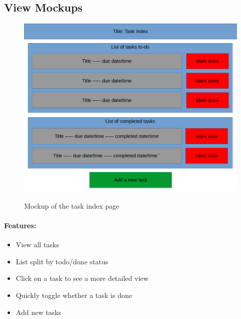 \documentclass{article}
\begin{document}
\subsection{View Mockups}
\begin{minipage}{0.5\textwidth}
	\begin{figure}[H]
		\includegraphics[width=\linewidth]{Mockups/task_index.png}
		\label{fig:task_index_mockup}
		\caption{Mockup of the task index page}
	\end{figure}
\end{minipage} \hfill
\begin{minipage}{0.45\textwidth}
	\paragraph{Features:}
	\begin{samepage}
		\begin{itemize}
			\item View all tasks
			\item List split by todo/done status
			\item Click on a task to see a more detailed view
			\item Quickly toggle whether a task is done
			\item Add new tasks
		\end{itemize}
	\end{samepage}
\end{minipage}
\end{document}
